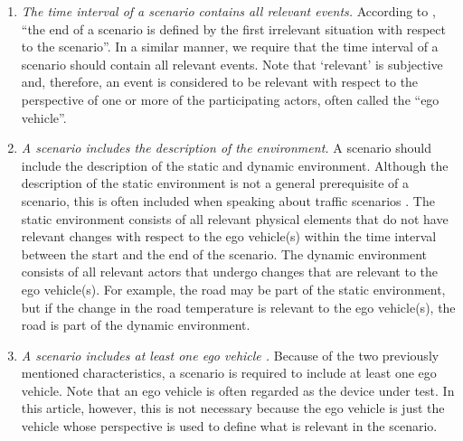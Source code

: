 \begin{enumerate}
	\item\textit{The time interval of a scenario contains all relevant events.}
	According to \textcite{geyer2014}, ``the end of a scenario is defined by the first irrelevant situation with respect to the scenario''. In a similar manner, we require that the time interval of a scenario should contain all relevant events. Note that `relevant' is subjective and, therefore, \cstarte an event is considered to be relevant with respect to the perspective of one or more of the participating actors, often called the ``ego vehicle''. \cende

	\item\textit{A scenario includes the description of the environment.}
	A scenario should include the description of the static and dynamic environment.
	Although the description of the static environment is not a general prerequisite of a scenario, this is often included when speaking about traffic scenarios \autocite{geyer2014, ulbrich2015, elrofai2016scenario, ebner2011identifying, althoff2017CommonRoad}.
	\cstartb The static environment consists of all relevant physical elements that do not have relevant changes with respect to the ego vehicle\cendb\cstartd (s) within the time interval between the start and the end of the scenario\cendd\cstartb. The dynamic environment consists of all relevant actors that \cendb\cstartd undergo \cendd\cstartb changes that are relevant to the ego vehicle\cendb\cstartd (s)\cendd\cstartb. For example, the road may be part of the static environment, but if the change in the road temperature is relevant to the ego vehicle\cendb\cstartd (s)\cendd\cstartb, the road is part of the dynamic environment.\cendb
	
	\cstartb
	\item\textit{A scenario includes \cendb\cstartd at least one \cendd\cstartb ego vehicle \autocite{geyer2014, elrofai2016scenario}.}
	Because of the two previously mentioned characteristics, a scenario is required to include \cendb\cstartd at least one \cendd\cstartb ego vehicle. \cendb
	\cstarte Note that an ego vehicle is often regarded as the device under test. In this article, however, this is not necessary because the ego vehicle is just the vehicle whose perspective is used to define what is relevant in the scenario. \cende
	

\end{enumerate}
